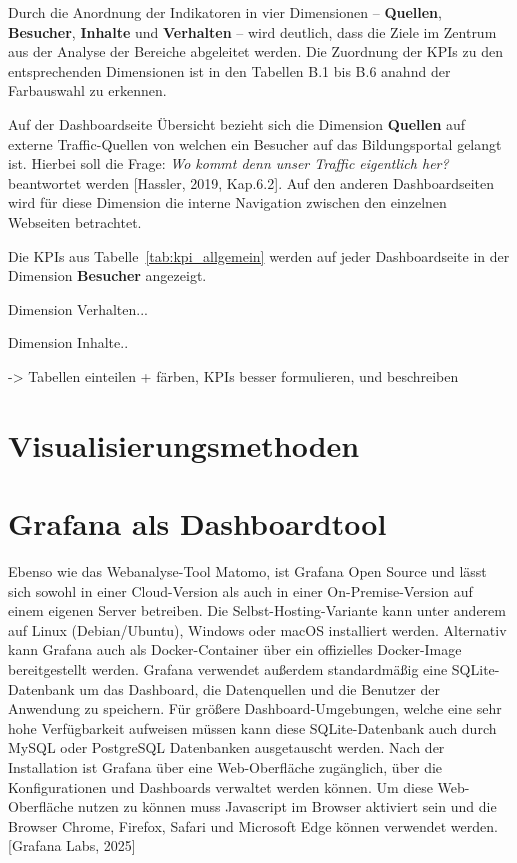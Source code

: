 Durch die Anordnung der Indikatoren in vier Dimensionen – \textbf{Quellen}, \textbf{Besucher}, \textbf{Inhalte} und \textbf{Verhalten} – wird deutlich, dass die Ziele im Zentrum aus der Analyse der Bereiche abgeleitet werden. Die Zuordnung der KPIs zu den entsprechenden Dimensionen ist in den Tabellen B.1 bis B.6 anahnd der Farbauswahl zu erkennen.

Auf der Dashboardseite \glqq Übersicht\grqq{} bezieht sich die Dimension \textbf{Quellen} auf externe Traffic-Quellen von welchen ein Besucher auf das Bildungsportal gelangt ist. Hierbei soll die Frage: \textit{\glqq Wo kommt denn unser Traffic eigentlich her?\grqq{}} beantwortet werden [Hassler, 2019, Kap.6.2]. Auf den anderen Dashboardseiten wird für diese Dimension die interne Navigation zwischen den einzelnen Webseiten betrachtet. 

Die KPIs aus Tabelle~\ref{tab:kpi_allgemein} werden auf jeder Dashboardseite in der Dimension \textbf{Besucher} angezeigt.


Dimension Verhalten...

Dimension Inhalte..


-> Tabellen einteilen + färben, KPIs besser formulieren, und beschreiben

\section{Visualisierungsmethoden}

\section{Grafana als Dashboardtool}
Ebenso wie das Webanalyse-Tool Matomo, ist Grafana Open Source und lässt sich sowohl in einer Cloud-Version als auch in einer On-Premise-Version auf einem eigenen Server betreiben. Die Selbst-Hosting-Variante kann unter anderem auf Linux (Debian/Ubuntu), Windows oder macOS installiert werden. Alternativ kann Grafana auch als Docker-Container über ein offizielles Docker-Image bereitgestellt werden. Grafana verwendet außerdem standardmäßig eine SQLite-Datenbank um das Dashboard, die Datenquellen und die Benutzer der Anwendung zu speichern. Für größere Dashboard-Umgebungen, welche eine sehr hohe Verfügbarkeit aufweisen müssen kann diese SQLite-Datenbank auch durch MySQL oder PostgreSQL Datenbanken ausgetauscht werden. Nach der Installation ist Grafana über eine Web-Oberfläche zugänglich, über die Konfigurationen und Dashboards verwaltet werden können. Um diese Web-Oberfläche nutzen zu können muss Javascript im Browser aktiviert sein und die Browser Chrome, Firefox, Safari und Microsoft Edge können verwendet werden. [Grafana Labs, 2025]

